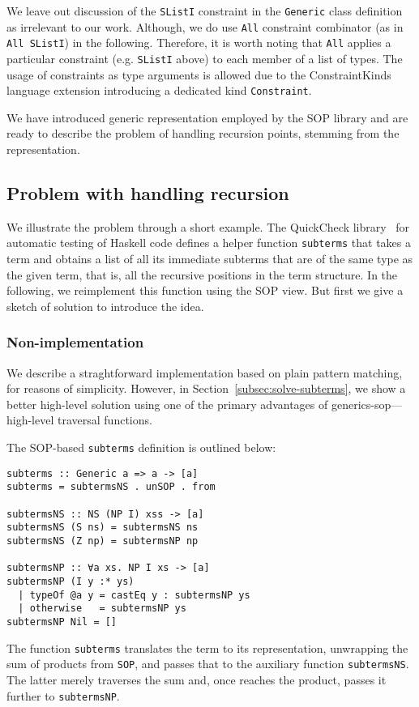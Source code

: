 \documentclass[runningheads]{llncs}
\newcommand{\K}[1]{\lstinline{#1}}
\begin{document}
We leave out discussion of the \K{SListI} constraint in the \K{Generic} class definition as irrelevant to our work. Although, we do use \K{All} constraint combinator (as in \K{All SListI}) in the following. Therefore, it is worth noting that \K{All} applies a particular constraint (e.g. \K{SListI} above) to each member of a list of types. The usage of constraints as type arguments is allowed due to the \textsf{ConstraintKinds} language extension introducing a dedicated kind \K{Constraint}.

We have introduced generic representation employed by the SOP library and are ready to describe the problem of handling recursion points, stemming from the representation. 

\subsection{Problem with handling recursion}
\label{subsec:recursion-problem}

We illustrate the problem through a short example. The \textsf{QuickCheck} library~\cite{Claessen2011} for automatic testing of Haskell code defines a helper function \K{subterms} that takes a term and obtains a list of all its immediate subterms that are of the same type as the given term, that is, all the recursive positions in the term structure. In the following, we reimplement this function using the SOP view. But first we give a sketch of solution to introduce the idea.

\subsubsection{Non-implementation}

We describe a straghtforward implementation based on plain pattern matching, for reasons of simplicity. However, in Section~\ref{subsec:solve-subterms}, we show a better high-level solution using one of the primary advantages of \textsf{generics-sop}---high-level traversal functions.

The SOP-based \K{subterms} definition is outlined below:
\begin{lstlisting}
subterms :: Generic a => a -> [a]
subterms = subtermsNS . unSOP . from

subtermsNS :: NS (NP I) xss -> [a]
subtermsNS (S ns) = subtermsNS ns
subtermsNS (Z np) = subtermsNP np

subtermsNP :: ∀a xs. NP I xs -> [a]
subtermsNP (I y :* ys)
  | typeOf @a y = castEq y : subtermsNP ys
  | otherwise   = subtermsNP ys
subtermsNP Nil = []
\end{lstlisting}
The function \K{subterms} translates the term to its representation, unwrapping the sum of products from \K{SOP}, and passes that to the auxiliary function \K{subtermsNS}. The latter merely traverses the sum and, once reaches the product,  passes it further to \K{subtermsNP}.
\end{document}
